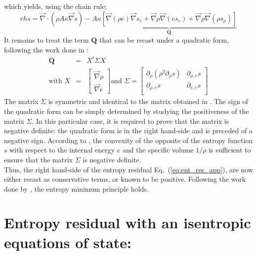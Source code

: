 \documentclass[preprint,10pt]{elsarticle}
\renewcommand{\div}{\vec{\nabla}\! \cdot \!}
\newcommand{\grad}{\vec{\nabla}}
\newcommand{\eqt}[1]{Eq.~(\ref{#1})}                     %
\begin{document}
%
which yields, using the chain rule:
%
\begin{equation}
rhs = \div (\rho A \kappa \grad s ) - A \kappa \underbrace{\left[ \grad (\rho e) \grad s_e  + \grad \rho \grad (e s_e) +  \grad \rho \grad ( \rho s_{\rho} )  \right]}_{\mathbf{Q}} \nonumber
\end{equation}
%
It remains to treat the term $\mathbf{Q}$ that can be recast under a quadratic form, following the work done in \cite{jlg}:
%
\begin{eqnarray}
\mathbf{Q} &=& X^t \Sigma X \nonumber \\
\text{with } X &=& \begin{bmatrix}
\grad \rho \\
\grad e 
\end{bmatrix}
\text{and } \Sigma = \begin{bmatrix}
       \partial_{\rho} (\rho^2 \partial_{\rho} s) & \partial_{\rho,e} s  \\[0.3em]
       \partial_{\rho,e} s & \partial_{e,e} s           \\[0.3em]
     \end{bmatrix} \nonumber 
\end{eqnarray}
%
The matrix $\Sigma$ is symmetric and identical to the matrix obtained in \cite{jlg}. The sign of the quadratic form can be simply determined by studying the positiveness of the matrix $\Sigma$. In this particular case, it is required to prove that the matrix is negative definite: the quadratic form is in the right hand-side and is preceded of a negative sign. According to \cite{jlg}, the convexity of the opposite of the entropy function $s$ with respect to the internal energy $e$ and the specific volume $1/ \rho$ is sufficient to ensure that the matrix $\Sigma$ is negative definite. \\
Thus, the right hand-side of the entropy residual \eqt{eq:ent_res_app}, are now either recast as conservative terms, or known to be positive. Following the work done by \cite{jlg}, the entropy minimum principle holds.

\newpage
\section{Entropy residual with an isentropic equations of state:} \label{app:ise_equ}
\end{document}
